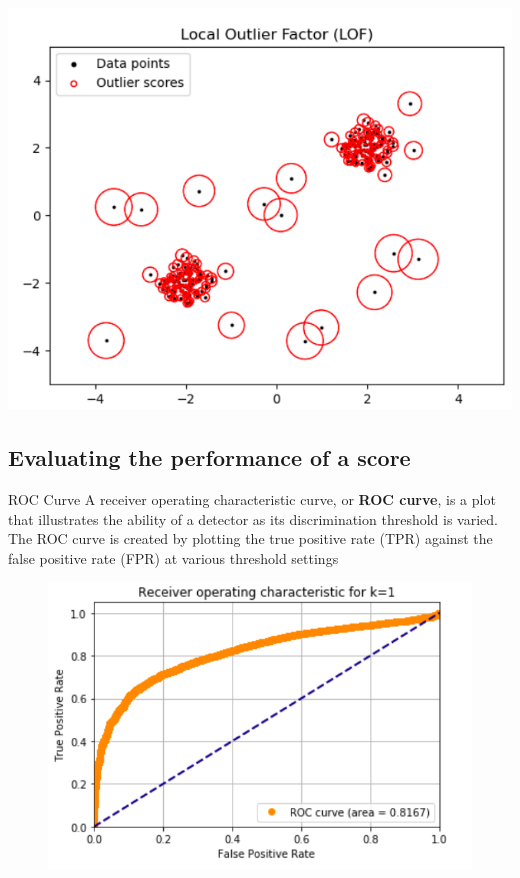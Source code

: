 \documentclass[10pt]{beamer}
\begin{document}
\begin{frame}
\includegraphics[width=.75\textwidth]{LOFPython}
\end{frame}

\subsection{Evaluating the performance of a score}
\begin{frame}{ROC Curve}
A receiver operating characteristic curve, or \textbf{ROC curve}, is a plot that illustrates the ability of a detector as its discrimination threshold is varied.
The ROC curve is created by plotting the true positive rate (TPR) against the false positive rate (FPR) at various threshold settings
\begin{figure}
\includegraphics[width=.75\textwidth]{ROC_CURVE}
\end{figure}
\end{frame}
\end{document}
